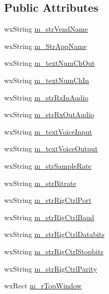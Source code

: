 \subsection*{Public Attributes}
\begin{DoxyCompactItemize}
\item 
wx\-String \hyperlink{class_main_app_a5a666c9feecd113dfd3b2f522b6d5fc9}{m\-\_\-str\-Vend\-Name}
\item 
wx\-String \hyperlink{class_main_app_a49d0cc802b97b1309a9d96c5c85b83b6}{m\-\_\-\-Str\-App\-Name}
\item 
wx\-String \hyperlink{class_main_app_aeac0e4eef0eb34a0cb974ac9208182aa}{m\-\_\-text\-Num\-Ch\-Out}
\item 
wx\-String \hyperlink{class_main_app_a6f04f0f61a76df541a59101b627448da}{m\-\_\-text\-Num\-Ch\-In}
\item 
wx\-String \hyperlink{class_main_app_a131c5ad5d714c9ed32a79467e788ac18}{m\-\_\-str\-Rx\-In\-Audio}
\item 
wx\-String \hyperlink{class_main_app_a73d4ee823e86cc78439be9f50ce4eca1}{m\-\_\-str\-Rx\-Out\-Audio}
\item 
wx\-String \hyperlink{class_main_app_a23f3ff36360c245d7f5f1fc3e9300c91}{m\-\_\-text\-Voice\-Input}
\item 
wx\-String \hyperlink{class_main_app_a94e76172a575851642a5b80ecf14a7b9}{m\-\_\-text\-Voice\-Output}
\item 
wx\-String \hyperlink{class_main_app_acd7dcb55a60f5b3a343238fdd60b748f}{m\-\_\-str\-Sample\-Rate}
\item 
wx\-String \hyperlink{class_main_app_a984c580c1f2831348b857777bd800585}{m\-\_\-str\-Bitrate}
\item 
wx\-String \hyperlink{class_main_app_ab191e22c827be40319221b07b0afc91e}{m\-\_\-str\-Rig\-Ctrl\-Port}
\item 
wx\-String \hyperlink{class_main_app_af367d4403e54c973f3b5d9708ac42318}{m\-\_\-str\-Rig\-Ctrl\-Baud}
\item 
wx\-String \hyperlink{class_main_app_a5ee4f9e7aed236fdf885442d5accf37f}{m\-\_\-str\-Rig\-Ctrl\-Databits}
\item 
wx\-String \hyperlink{class_main_app_ab9b597849713a2a3a18782243c2cbf89}{m\-\_\-str\-Rig\-Ctrl\-Stopbits}
\item 
wx\-String \hyperlink{class_main_app_ab61a6ceb5655721d22b71a28fbe4aab2}{m\-\_\-str\-Rig\-Ctrl\-Parity}
\item 
wx\-Rect \hyperlink{class_main_app_aef360a075faca729e3ad9d352b778478}{m\-\_\-r\-Top\-Window}
\end{DoxyCompactItemize}


